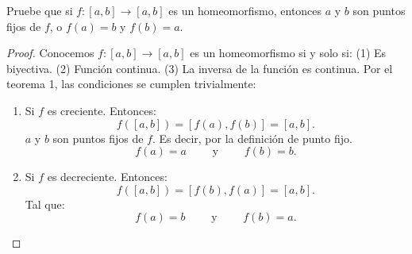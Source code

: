 Pruebe que si $f:[a, b] \rightarrow[a, b]$ es un homeomorfismo, entonces $a$ y $b$ son puntos fijos de $f$, o $f(a)=b$ y $f(b)=a$.
\begin{proof}
	Conocemos $f:[a, b] \rightarrow[a, b]$ es un homeomorfismo si y solo si: (1) Es biyectiva. (2) Función continua. (3) La inversa de la función es continua. Por el teorema 1, las condiciones se cumplen trivialmente: 
	\begin{enumerate}
		\item Si $f$ es creciente. Entonces: 
		$$f([a,b])=[f(a),f(b)]=[a,b].$$
		$a$ y $b$ son puntos fijos de $f$. Es decir, por la definición de punto fijo. $$ f(a)=a \qquad \text{ y } \qquad f(b)=b.$$
		\item Si $f$ es decreciente. Entonces: 
		$$f([a,b])=[f(b),f(a)]=[a,b].$$
		Tal que: 
		 $$f(a)=b\qquad  \text{ y } \qquad f(b)=a.$$ 
	\end{enumerate}
\end{proof}

